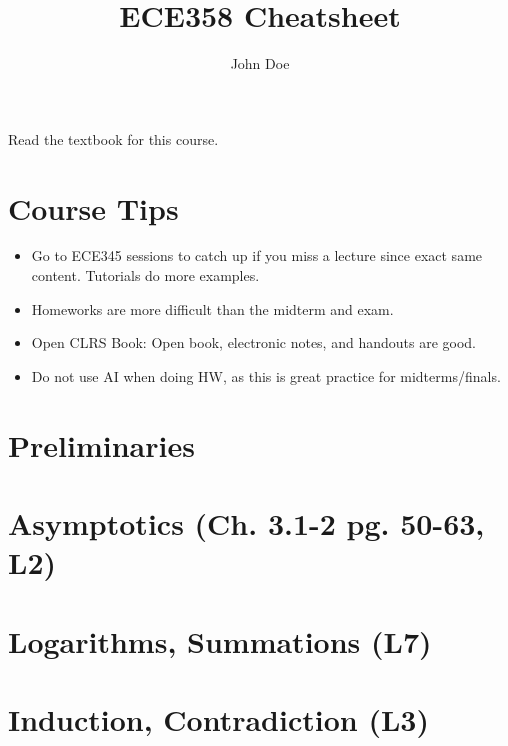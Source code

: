 \documentclass{article}
\title{ECE358 Cheatsheet}
\author{John Doe}
\begin{document}
\maketitle

\tableofcontents

\listoffigures

\listoftables

Read the textbook for this course. 

\section{Course Tips}
\begin{intuition}
    \begin{itemize}
        \item Go to ECE345 sessions to catch up if you miss a lecture since exact same content. Tutorials do more examples. 
        \item Homeworks are more difficult than the midterm and exam.
        \item Open CLRS Book: Open book, electronic notes, and handouts are good. 
        \item Do not use AI when doing HW, as this is great practice for midterms/finals.
    \end{itemize}
\end{intuition}

\section{Preliminaries}


\section{Asymptotics (Ch. 3.1-2 pg. 50-63, L2)} 


\section{Logarithms, Summations (L7)} %


\section{Induction, Contradiction (L3)} %


\end{document}

